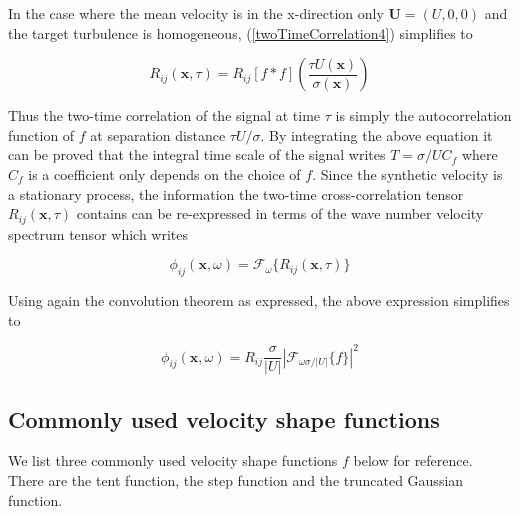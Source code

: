 \noindent In the case where the mean velocity is in the x-direction only $\boldsymbol{U} = (U,0,0)$ and the target turbulence is homogeneous, (\ref{twoTimeCorrelation4}) simplifies to

\begin{equation}
R_{ij}(\boldsymbol{x},\tau) = R_{ij} [f*f]\left(\frac{\tau U(\boldsymbol{x})}{\sigma(\boldsymbol{x})}\right)
\end{equation}

\noindent Thus the two-time correlation of the signal at time $\tau$ is simply the autocorrelation function of $f$ at separation distance $\tau U /\sigma$. By integrating the above equation it can be proved that the integral time scale of the signal writes $T = \sigma/U C_f$ where $C_f$ is a coefficient only depends on the choice of $f$. Since the synthetic velocity is a stationary process, the information the two-time cross-correlation tensor $R_{ij}(\boldsymbol{x},\tau)$ contains can be re-expressed in terms of the wave number velocity spectrum tensor which writes

\begin{equation}
\phi_{ij}(\boldsymbol{x},\omega) = \mathcal{F}_{\omega}\{R_{ij}(\boldsymbol{x},\tau)\}
\end{equation}

\noindent Using again the convolution theorem as expressed, the above expression simplifies to

\begin{equation}
\phi_{ij}(\boldsymbol{x},\omega) = R_{ij}\frac{\sigma}{|U|} |\mathcal{F}_{\omega\sigma / |U|}\{f\}|^2
\end{equation}

\subsection{Commonly used velocity shape functions}

We list three commonly used velocity shape functions $f$ below for reference. There are the tent function, the step function and the truncated Gaussian function.


